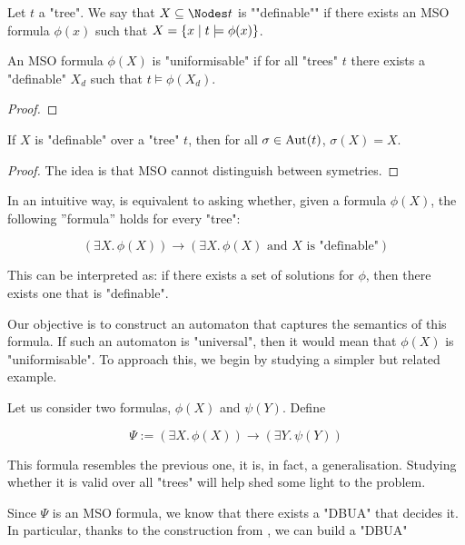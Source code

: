 \documentclass[a4paper,UKenglish,cleveref, autoref, thm-restate]{lipics-v2021}
\begin{document}
\begin{definition}\label{def:definable}
	Let $t$ a "tree". We say that $X \subseteq \Nodes t$ is ""definable"" if there exists an MSO formula $\phi(x)$ such that $ X = \left\{x \mid t \models \phi(x)\right\}$.
\end{definition}

\begin{lemma}
	An MSO formula $\phi(X)$ is "uniformisable" if for all "trees" $t$ there exists a "definable" $X_d$ such that $t \models \phi(X_d)$.
\end{lemma}

\begin{proof}
\end{proof}



\begin{lemma}\label{lem:def-aut}
	If $X$ is "definable" over a "tree" $t$, then for all $\sigma \in \text{Aut}(t)$, $\sigma(X) = X$.
\end{lemma}

\begin{proof}
	\todo{~}
    The idea is that MSO cannot distinguish between symetries.
\end{proof}


In an intuitive way,  is equivalent to asking whether,
given a formula $\phi(X)$, the following ''formula'' holds for every "tree":

\[
	(\exists X.\, \phi(X)) \rightarrow (\exists X.\, \phi(X) \text{ and $X$ is "definable"})
\]

This can be interpreted as: if there exists a set of solutions for $\phi$, then there exists one that is "definable".

Our objective is to construct an automaton that captures the semantics of this formula. If such an automaton is "universal",
then it would mean that $\phi(X)$ is "uniformisable". To approach this, we begin by studying a simpler but related example.

Let us consider two formulas, $\phi(X)$ and $\psi(Y)$. Define

\[
	\Psi := (\exists X.\, \phi(X)) \rightarrow (\exists Y.\, \psi(Y))
\]

This formula resembles the previous one, it is, in fact, a generalisation. Studying whether it is valid over all "trees" will
help shed some light to the problem.

Since $\Psi$ is an MSO formula, we know that there exists a "DBUA" that decides it. In particular, thanks to the
construction from , we can build a "DBUA"
\end{document}
